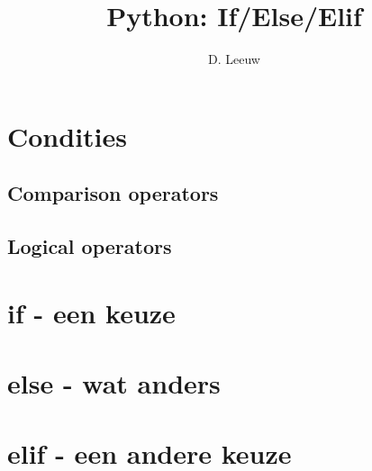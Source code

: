 \documentclass[a4paper,12pt,twoside,titlepage]{article}
\author{D. Leeuw}
\title{Python: If/Else/Elif}
\date{\today\\
0.0.0\\
\vfill
\raggedright
\copyright\ 2025 Dennis Leeuw\\
}
\begin{document}

\maketitle



\section{Condities}

\subsection{Comparison operators}

\subsection{Logical operators}


\section{if - een keuze}


\section{else - wat anders}


\section{elif - een andere keuze}


\printindex
\end{document}
